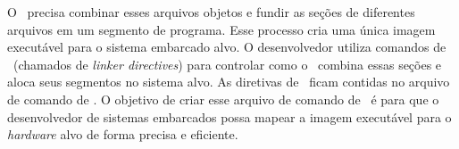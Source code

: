 




O \linker\ precisa combinar esses arquivos objetos e fundir as seções de diferentes arquivos em um segmento de programa. Esse processo cria uma única imagem executável para o sistema embarcado alvo. O desenvolvedor utiliza comandos de \linker\ (chamados de \textit{linker directives}) para controlar como o \linker\ combina essas seções e aloca seus segmentos no sistema alvo. As diretivas de \linker\ ficam contidas no arquivo de comando de \linker. O objetivo de criar esse arquivo de comando de \linker\ é para que o desenvolvedor de sistemas embarcados possa mapear a imagem executável para o \textit{hardware} alvo de forma precisa e eficiente. 

